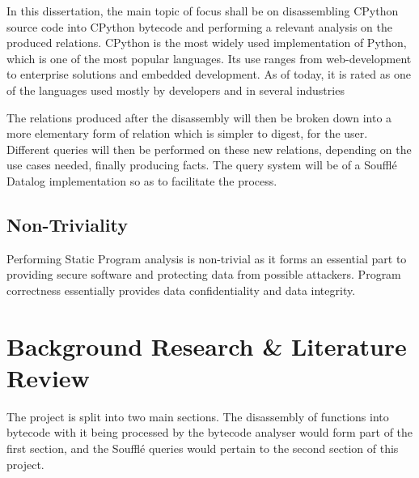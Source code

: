 \documentclass[12pt, a4paper]{report}
\theoremstyle{definition}
\theoremstyle{definition}%
\theoremstyle{definition}%
\theoremstyle{definition}%
\theoremstyle{definition}%
\theoremstyle{definition}%
\begin{document}
    \par In this dissertation, the main topic of focus shall be on disassembling CPython source code into 
    CPython bytecode and performing a relevant analysis on the produced relations.
    CPython is the most widely used implementation of Python, which is one of the most popular languages. 
    Its use ranges from web-development to enterprise solutions and embedded development. As of today, it is 
    rated as one of the languages used mostly by developers and in several industries %

    The relations produced after the disassembly will then be broken down into a more elementary form 
    of relation which is simpler to digest, for the user. Different queries will then be performed on these 
    new relations, depending on the use cases needed, finally producing facts. The query system will be 
    of a Soufflé Datalog implementation so as to facilitate the process.
    \section{Non-Triviality}
    \par Performing Static Program analysis is non-trivial as it forms an essential part to providing secure software and protecting data
    from possible attackers. Program correctness essentially provides data confidentiality and data integrity. %

    
\chapter{Background Research \& Literature Review}

    \par The project is split into two main sections. The disassembly of functions into bytecode with it being processed by 
    the bytecode analyser would form part of the first section, and the Soufflé queries would pertain to the second section of 
    this project.
\end{document}
